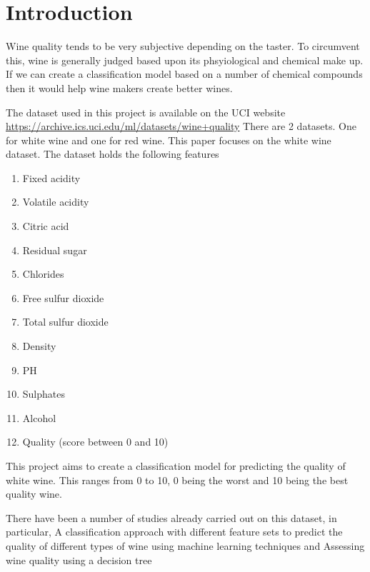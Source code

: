 \section{Introduction}

Wine quality tends to be very subjective depending on the taster. To circumvent this, wine is generally judged based upon its phsyiological and chemical make up. If we can create a classification model based on a number of chemical compounds then it would help wine makers create better wines. 

The dataset used in this project is available on the UCI website \url{https://archive.ics.uci.edu/ml/datasets/wine+quality} There are 2 datasets. One for white wine and one for red wine. This paper focuses on the white wine dataset. The dataset holds the following features

\begin{enumerate}
  \item Fixed acidity 
  \item Volatile acidity
  \item Citric acid 
  \item Residual sugar 
  \item Chlorides
  \item Free sulfur dioxide 
  \item Total sulfur dioxide 
  \item Density
  \item PH
  \item Sulphates
  \item Alcohol
  \item Quality (score between 0 and 10)
\end{enumerate}

This project aims to create a classification model for predicting the quality of white wine. This ranges from 0 to 10, 0 being the worst and 10 being the best quality wine.

There have been a number of studies already carried out on this dataset, in particular, A classification approach with different feature sets to predict the quality of different types of wine using machine learning techniques\cite{8323674} and Assessing wine quality using a decision tree\cite{7302752}

